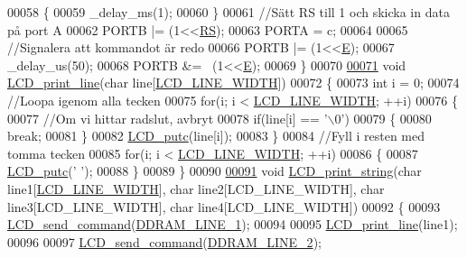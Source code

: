 \begin{DoxyCode}
{00058     \{
00059         \_delay\_ms(1);
00060     \}
00061     \textcolor{comment}{//Sätt RS till 1 och skicka in data på port A}
00062     PORTB |= (1<<\hyperlink{_l_c_d_8c_af8903d8eea3868940c60af887473b152}{RS});
00063     PORTA = c;
00064     
00065     \textcolor{comment}{//Signalera att kommandot är redo}
00066     PORTB |= (1<<\hyperlink{_l_c_d_8c_a07484107e6d9fdf38b53edf631d6511d}{E});
00067     \_delay\_us(50);
00068     PORTB &= ~(1<<\hyperlink{_l_c_d_8c_a07484107e6d9fdf38b53edf631d6511d}{E});
00069 \}
00070 
\hypertarget{_l_c_d_8c_source.tex_l00071}{}\hyperlink{_l_c_d_8c_a0da229bb95e0c51e189ce10e20eb91c5}{00071} \textcolor{keywordtype}{void} \hyperlink{_l_c_d_8c_a0da229bb95e0c51e189ce10e20eb91c5}{LCD\_print\_line}(\textcolor{keywordtype}{char} line[\hyperlink{_l_c_d_8h_a5bdd8750b215c775f2227262a1934b54}{LCD\_LINE\_WIDTH}])
00072 \{
00073     \textcolor{keywordtype}{int} i = 0;
00074     \textcolor{comment}{//Loopa igenom alla tecken}
00075     \textcolor{keywordflow}{for}(i; i < \hyperlink{_l_c_d_8h_a5bdd8750b215c775f2227262a1934b54}{LCD\_LINE\_WIDTH}; ++i)
00076     \{
00077         \textcolor{comment}{//Om vi hittar radslut, avbryt}
00078         \textcolor{keywordflow}{if}(line[i] == \textcolor{charliteral}{'\(\backslash\)0'})
00079         \{
00080             \textcolor{keywordflow}{break};
00081         \}
00082         \hyperlink{_l_c_d_8c_a7a19aaec7f9deb1589a7efddf3da8d3f}{LCD\_putc}(line[i]);
00083     \}
00084     \textcolor{comment}{//Fyll i resten med tomma tecken}
00085     \textcolor{keywordflow}{for}(i; i < \hyperlink{_l_c_d_8h_a5bdd8750b215c775f2227262a1934b54}{LCD\_LINE\_WIDTH}; ++i)
00086     \{
00087         \hyperlink{_l_c_d_8c_a7a19aaec7f9deb1589a7efddf3da8d3f}{LCD\_putc}(\textcolor{charliteral}{' '});
00088     \}
00089 \}
00090 
\hypertarget{_l_c_d_8c_source.tex_l00091}{}\hyperlink{_l_c_d_8h_afbc155e4e9d279ccd12c2695fe78a0e3}{00091} \textcolor{keywordtype}{void} \hyperlink{_l_c_d_8c_afbc155e4e9d279ccd12c2695fe78a0e3}{LCD\_print\_string}(\textcolor{keywordtype}{char} line1[\hyperlink{_l_c_d_8h_a5bdd8750b215c775f2227262a1934b54}{LCD\_LINE\_WIDTH}], \textcolor{keywordtype}{char} line2[LCD\_LINE\_WIDTH],
       \textcolor{keywordtype}{char} line3[LCD\_LINE\_WIDTH], \textcolor{keywordtype}{char} line4[LCD\_LINE\_WIDTH])
00092 \{   
00093     \hyperlink{_l_c_d_8c_aa6d8c104e37eef62ba3a6046d1333ca6}{LCD\_send\_command}(\hyperlink{_l_c_d_8c_acc9e762cf3909d10f4c35e47e7c0f2e8}{DDRAM\_LINE\_1});
00094     
00095     \hyperlink{_l_c_d_8c_a0da229bb95e0c51e189ce10e20eb91c5}{LCD\_print\_line}(line1);
00096     
00097     \hyperlink{_l_c_d_8c_aa6d8c104e37eef62ba3a6046d1333ca6}{LCD\_send\_command}(\hyperlink{_l_c_d_8c_a99ff4cbdf292fa1d55ed18e57d07a139}{DDRAM\_LINE\_2});
}
\end{DoxyCode}
